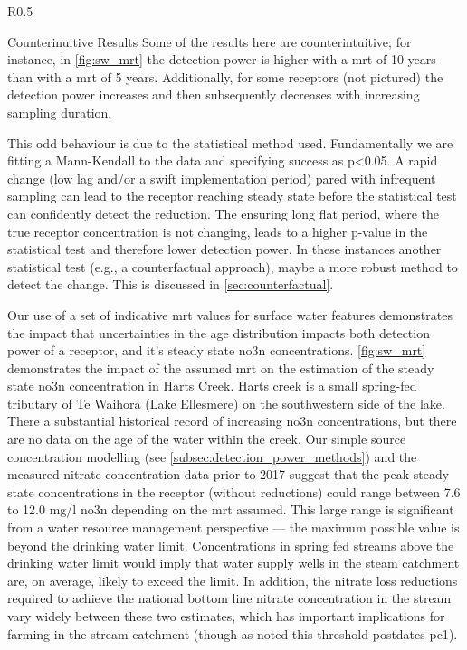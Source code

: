 \begin{wrapfigure}{R}{0.5\textwidth}
    \begin{breakawaybox}[
        label={box:wierdresults}]{Counterinuitive Results}
        Some of the results here are counterintuitive; for instance, in \autoref{fig:sw_mrt} the detection power is higher with a \gls{mrt} of 10 years than with a \gls{mrt} of 5 years. Additionally, for some receptors (not pictured) the detection power increases and then subsequently decreases with increasing sampling duration.

        This odd behaviour is due to the statistical method used. Fundamentally we are fitting a Mann-Kendall to the data and specifying success as p<0.05. A rapid change (low lag and/or a swift implementation period) pared with infrequent sampling can lead to the receptor reaching steady state before the statistical test can confidently detect the reduction. The ensuring long flat period, where the true receptor concentration is not changing, leads to a higher p-value in the statistical test and therefore lower detection power. In these instances another statistical test (e.g., a counterfactual approach), maybe a more robust method to detect the change. This is discussed in \autoref{sec:counterfactual}.
    \end{breakawaybox}
\end{wrapfigure}

Our use of a set of indicative \gls{mrt} values for surface water features demonstrates the impact that uncertainties in the age distribution impacts both detection power of a receptor, and it's steady state \gls{no3n} concentrations.
\autoref{fig:sw_mrt} demonstrates the impact of the assumed \gls{mrt} on the estimation of the steady state \gls{no3n} concentration in Harts Creek.
Harts creek is a small spring-fed tributary of Te Waihora (Lake Ellesmere) on the southwestern side of the lake.
There a substantial historical record of increasing \gls{no3n} concentrations, but there are no data on the age of the water within the creek.
Our simple source concentration modelling (see \autoref{subsec:detection_power_methods}) and the measured nitrate concentration data prior to 2017 suggest that the peak steady state concentrations in the receptor (without reductions) could range between 7.6 to 12.0 mg/l \gls{no3n} depending on the \gls{mrt} assumed.
This large range is significant from a water resource management perspective --- the maximum possible value is beyond the drinking water limit.
Concentrations in spring fed streams above the drinking water limit would imply that water supply wells in the steam catchment are, on average, likely to exceed the limit.
In addition, the nitrate loss reductions required to achieve the national bottom line nitrate concentration in the stream vary widely between these two estimates, which has important implications for farming in the stream catchment (though as noted this threshold postdates \gls{pc1}).

